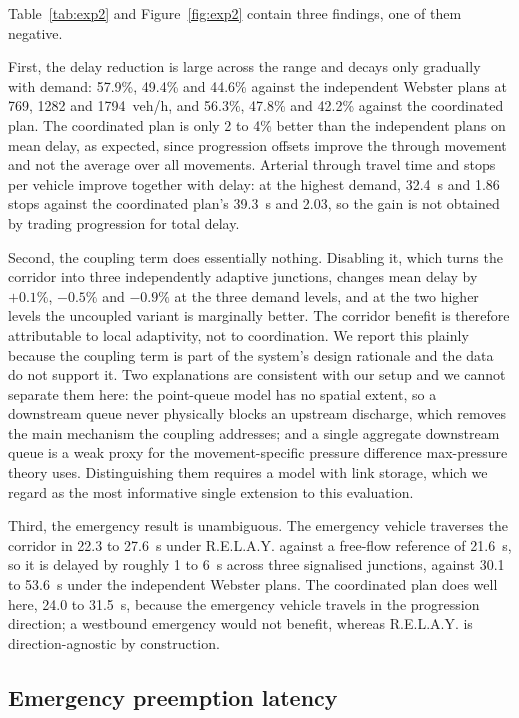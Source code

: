 \documentclass[journal]{IEEEtran}
\newcommand{\relay}{R.E.L.A.Y.}
\begin{document}
Table~\ref{tab:exp2} and Figure~\ref{fig:exp2} contain three findings, one of them negative.

First, the delay reduction is large across the range and decays only gradually with demand: 57.9\%,
49.4\% and 44.6\% against the independent Webster plans at 769, 1282 and 1794~veh/h, and 56.3\%,
47.8\% and 42.2\% against the coordinated plan. The coordinated plan is only 2 to 4\% better than the
independent plans on mean delay, as expected, since progression offsets improve the through movement
and not the average over all movements. Arterial through travel time and stops per vehicle improve
together with delay: at the highest demand, 32.4~s and 1.86 stops against the coordinated plan's
39.3~s and 2.03, so the gain is not obtained by trading progression for total delay.

Second, the coupling term does essentially nothing. Disabling it, which turns the corridor into three
independently adaptive junctions, changes mean delay by $+0.1\%$, $-0.5\%$ and $-0.9\%$ at the three
demand levels, and at the two higher levels the uncoupled variant is marginally better. The corridor
benefit is therefore attributable to local adaptivity, not to coordination. We report this plainly
because the coupling term is part of the system's design rationale and the data do not support it.
Two explanations are consistent with our setup and we cannot separate them here: the point-queue
model has no spatial extent, so a downstream queue never physically blocks an upstream discharge,
which removes the main mechanism the coupling addresses; and a single aggregate downstream queue is a
weak proxy for the movement-specific pressure difference max-pressure theory uses. Distinguishing
them requires a model with link storage, which we regard as the most informative single extension to
this evaluation.

Third, the emergency result is unambiguous. The emergency vehicle traverses the corridor in 22.3 to
27.6~s under \relay{} against a free-flow reference of 21.6~s, so it is delayed by roughly 1 to 6~s
across three signalised junctions, against 30.1 to 53.6~s under the independent Webster plans. The
coordinated plan does well here, 24.0 to 31.5~s, because the emergency vehicle travels in the
progression direction; a westbound emergency would not benefit, whereas \relay{} is direction-agnostic
by construction.

\subsection{Emergency preemption latency}
\end{document}
